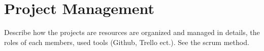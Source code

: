 \section{Project Management}\label{sec:projectmanagement}
Describe how the projects are resources are organized and managed in details, the roles of each members, used tools (Github, Trello ect.). See the scrum method. 
\clearpage
